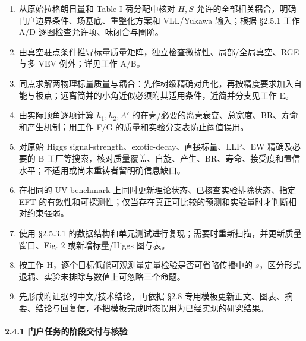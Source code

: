 \documentclass[
  chinese,
  UTF8]{ctexart}
\providecommand{\tightlist}{%
  \setlength{\itemsep}{0pt}\setlength{\parskip}{0pt}}
\begin{document}
\begin{enumerate}
\def\labelenumi{\arabic{enumi}.}
\tightlist
\item
  从原始拉格朗日量和 Table I 荷分配中核对 \(H,S\)
  允许的全部相关耦合，明确门户边界条件、场基底、重整化方案和 VLL/Yukawa
  输入；根据 §2.5.1 工作 A/D 逐图检查允许项、味闭合与圈阶。
\item
  由真空驻点条件推导标量质量矩阵，独立检查微扰性、局部/全局真空、RGE
  与多 VEV 例外；详见工作 A/B。
\item
  同点求解两物理标量质量与耦合：先作树级精确对角化，再按精度要求加入自能与极点；远离简并的小角近似必须附其适用条件，近简并分支见工作
  E。
\item
  由实际顶角逐项计算 \(h_1,h_2,A'\)
  的在壳/必要的离壳衰变、总宽度、BR、寿命和产生机制；用工作 F/G
  的质量和实验分支表防止阈值误用。
\item
  对原始 Higgs signal-strength、exotic-decay、直接标量、LLP、EW
  精确及必要的 B
  工厂等搜索，核对质量覆盖、自旋、产生、BR、寿命、接受度和置信水平；不适用或尚未重铸者留明确信息缺口。
\item
  在相同的 UV benchmark 上同时更新理论状态、已核查实验排除状态、指定 EFT
  的有效性和可探测性；仅当存在真正可比较的预测和实验量时才判断相对约束强弱。
\item
  使用 §2.5.3.1
  的数据结构和单元测试进行复现；需要时重新扫描，并更新质量窗口、Fig. 2
  或新增标量/Higgs 图与表。
\item
  按工作 H，逐个目标低能可观测量定量检验是否可省略传播中的
  \(s\)，区分形式退耦、实验未排除与数值上可忽略三个命题。
\item
  先形成附证据的中文/技术结论，再依据 §2.8
  专用模板更新正文、图表、摘要、结论与回复信，不把模板完成时态误用为已经实现的研究结果。
\end{enumerate}

\paragraph{2.4.1
门户任务的阶段交付与核验}\label{ux95e8ux6237ux4efbux52a1ux7684ux9636ux6bb5ux4ea4ux4ed8ux4e0eux6838ux9a8c}
\end{document}
